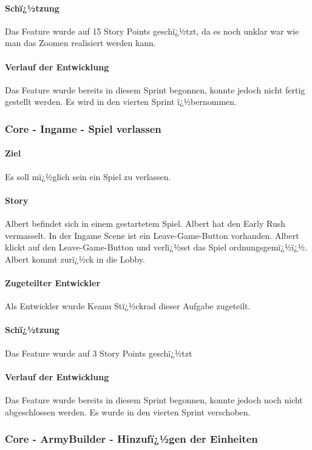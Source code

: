 \documentclass[12pt, titlepage]{scrartcl}
\begin{document}
		\paragraph{Schï¿½tzung}
		Das Feature wurde auf 15 Story Points geschï¿½tzt, da es noch unklar war wie man das Zoomen realisiert werden kann.
		\paragraph{Verlauf der Entwicklung} 
		Das Feature wurde bereits in diesem Sprint begonnen, konnte jedoch nicht fertig gestellt werden. Es wird in den vierten Sprint ï¿½bernommen.
		
		\subsubsection{Core - Ingame - Spiel verlassen}
		\paragraph{Ziel} Es soll mï¿½glich sein ein Spiel zu verlassen.
		\paragraph{Story} Albert befindet sich in einem gestartetem Spiel. Albert hat den Early Rush vermasselt. In der Ingame Scene ist ein Leave-Game-Button vorhanden. Albert klickt auf den Leave-Game-Button und verlï¿½sst das Spiel ordnungsgemï¿½ï¿½. Albert kommt zurï¿½ck in die Lobby.
		\paragraph{Zugeteilter Entwickler} Als Entwickler wurde Keanu Stï¿½ckrad dieser Aufgabe zugeteilt.
		\paragraph{Schï¿½tzung}
		Das Feature wurde auf 3 Story Points geschï¿½tzt
		\paragraph{Verlauf der Entwicklung} 
		Das Feature wurde bereits in diesem Sprint begonnen, konnte jedoch noch nicht abgeschlossen werden. Es wurde in den vierten Sprint verschoben.
		
		\subsubsection{Core - ArmyBuilder - Hinzufï¿½gen der Einheiten}
\end{document}
